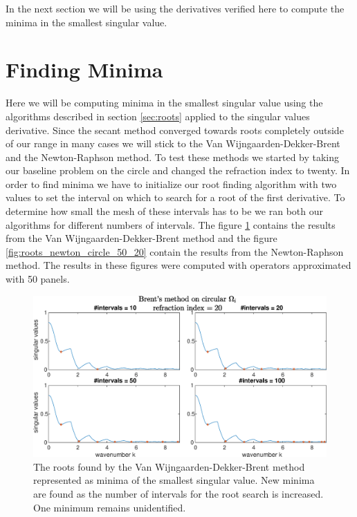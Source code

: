 \documentclass[a4paper, oneside]{thirdparty_stylesheets/discothesis}
\begin{document}
In the next section we will be using the derivatives verified here to compute the minima in the smallest singular value.

\section{Finding Minima}
Here we will be computing minima in the smallest singular value using the algorithms described in section \ref{sec:roots} applied to the singular values derivative.
Since the secant method converged towards roots completely outside of our range in many cases we will stick to the Van Wijngaarden-Dekker-Brent and the Newton-Raphson method.
To test these methods we started by taking our baseline problem on the circle and changed the refraction index to twenty.
In order to find minima we have to initialize our root finding algorithm with two values to set the interval on which to search for a root of the first derivative.
To determine how small the mesh of these intervals has to be we ran both our algorithms for different numbers of intervals.
The figure \ref{fig:roots_brent_circle_50_20} contains the results from the Van Wijngaarden-Dekker-Brent method and the figure \ref{fig:roots_newton_circle_50_20} contain the results from the Newton-Raphson method.
The results in these figures were computed with operators approximated with 50 panels.
\begin{figure} [H]
	\centering
	\includegraphics[width=\columnwidth]{figures/roots_brent_circle_50_20.eps}
	\caption{
		The roots found by the Van Wijngaarden-Dekker-Brent method represented as minima of the smallest singular value.
		New minima are found as the number of intervals for the root search is increased.
		One minimum remains unidentified.
	}

	\label{fig:roots_brent_circle_50_20}
\end{figure}
\end{document}
